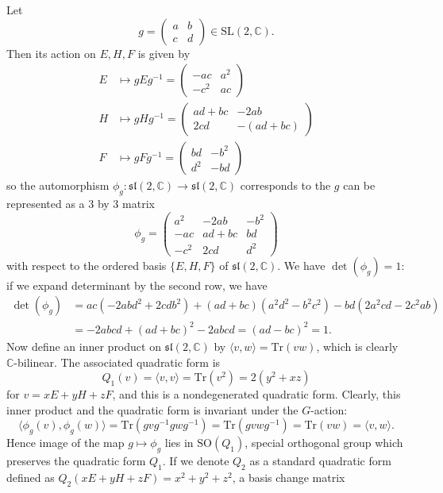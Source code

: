 \documentclass{article}
\newcommand{\SO}{\mathrm{SO}}
\newcommand{\SL}{\mathrm{SL}}
\newcommand{\Tr}{\mathrm{Tr}}
\begin{document}
Let $$g = \begin{pmatrix} a&b\\c&d\end{pmatrix}\in \SL(2, \mathbb{C}).$$
Then its action on $E, H, F$ is given by 
\begin{align*}
E&\mapsto gEg^{-1}  = \begin{pmatrix} -ac & a^{2} \\ -c^{2} & ac\end{pmatrix} \\
H&\mapsto gHg^{-1} = \begin{pmatrix} ad+bc & -2ab \\ 2cd & -(ad+bc)\end{pmatrix} \\
F&\mapsto gFg^{-1}  = \begin{pmatrix} bd & -b^{2} \\ d^{2} & -bd\end{pmatrix} 
\end{align*}
so the automorphism $\phi_{g}:\mathfrak{sl}(2, \mathbb{C})\to \mathfrak{sl}(2, \mathbb{C})$ corresponds to the $g$ can be represented as a 3 by 3 matrix 
$$
\phi_{g} = \begin{pmatrix} a^{2} & -2ab & -b^{2} \\ -ac & ad+bc & bd \\ -c^{2} & 2cd & d^{2} \end{pmatrix}
$$
with respect to the ordered basis $\{E, H, F\}$ of $\mathfrak{sl}(2, \mathbb{C})$. We have $\det(\phi_{g}) = 1$: if we expand determinant by the second row, we have 
\begin{align*}
\det(\phi_{g}) &= ac(-2abd^{2}+2cdb^{2}) + (ad+bc)(a^{2}d^{2}-b^{2}c^{2}) - bd(2a^{2}cd-2c^{2}ab) \\
&= -2abcd + (ad+bc)^{2} - 2abcd = (ad-bc)^{2} =1.
\end{align*}
Now define an inner product on $\mathfrak{sl}(2, \mathbb{C})$ by 
$
\langle v, w\rangle = \Tr(vw)
$, which is clearly $\mathbb{C}$-bilinear. 
The associated quadratic form is 
$$Q_{1}(v)  = \langle v, v\rangle = \Tr(v^{2}) = 2(y^{2}+xz)$$
for $v = xE + yH + zF$, and this is a nondegenerated quadratic form. 
Clearly, this inner product and the quadratic form is invariant under the $G$-action: 
$$
\langle \phi_{g}(v), \phi_{g}(w)\rangle = \Tr(gvg^{-1}gwg^{-1}) = \Tr(gvwg^{-1}) = \Tr(vw) = \langle v, w\rangle. 
$$
Hence image of the map $g\mapsto \phi_{g}$ lies in $\SO(Q_{1})$, special orthogonal group which preserves the quadratic form $Q_{1}$. 
If we denote $Q_{2}$ as a standard quadratic form defined as $Q_{2}(xE+yH+zF) = x^{2}+y^{2}+z^{2}$, a basis change matrix
\end{document}
